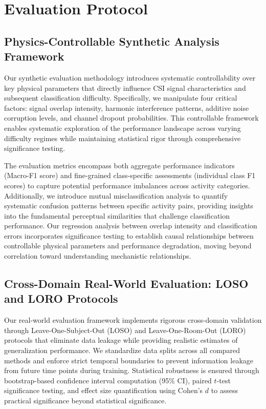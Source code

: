 \documentclass[10pt,conference]{IEEEtran}
\begin{document}
\section{Evaluation Protocol}

\subsection{Physics-Controllable Synthetic Analysis Framework}

Our synthetic evaluation methodology introduces systematic controllability over key physical parameters that directly influence CSI signal characteristics and subsequent classification difficulty. Specifically, we manipulate four critical factors: signal overlap intensity, harmonic interference patterns, additive noise corruption levels, and channel dropout probabilities. This controllable framework enables systematic exploration of the performance landscape across varying difficulty regimes while maintaining statistical rigor through comprehensive significance testing.

The evaluation metrics encompass both aggregate performance indicators (Macro-F1 score) and fine-grained class-specific assessments (individual class F1 scores) to capture potential performance imbalances across activity categories. Additionally, we introduce mutual misclassification analysis to quantify systematic confusion patterns between specific activity pairs, providing insights into the fundamental perceptual similarities that challenge classification performance. Our regression analysis between overlap intensity and classification errors incorporates significance testing to establish causal relationships between controllable physical parameters and performance degradation, moving beyond correlation toward understanding mechanistic relationships.

\subsection{Cross-Domain Real-World Evaluation: LOSO and LORO Protocols}

Our real-world evaluation framework implements rigorous cross-domain validation through Leave-One-Subject-Out (LOSO) and Leave-One-Room-Out (LORO) protocols that eliminate data leakage while providing realistic estimates of generalization performance. We standardize data splits across all compared methods and enforce strict temporal boundaries to prevent information leakage from future time points during training. Statistical robustness is ensured through bootstrap-based confidence interval computation (95\% CI), paired $t$-test significance testing, and effect size quantification using Cohen's $d$ to assess practical significance beyond statistical significance.
\end{document}
